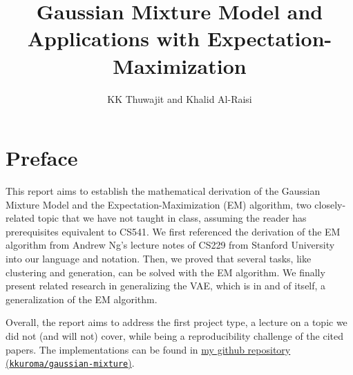 \documentclass{article}
\title{Gaussian Mixture Model and Applications with Expectation-Maximization}
\author{KK Thuwajit and Khalid Al-Raisi}
\begin{document}
\newtheorem{theorem}{Theorem}
\newtheorem{lemma}{Lemma}
\theoremstyle{definition}
\newtheorem{definition}{Definition}
\newtheorem{example}{Example}
\maketitle
\tableofcontents
\newpage
\section*{Preface}
This report aims to establish the mathematical derivation of the Gaussian Mixture Model and the Expectation-Maximization (EM) algorithm, two closely-related topic that we have not taught in class, assuming the reader has prerequisites equivalent to CS541. We first referenced the derivation of the EM algorithm from Andrew Ng's lecture notes of CS229 from Stanford University \cite{em_notes} into our language and notation. Then, we proved that several tasks, like clustering and generation, can be solved with the EM algorithm. We finally present related research in generalizing the VAE, which is in and of itself, a generalization of the EM algorithm.

Overall, the report aims to address the first project type, a lecture on a topic we did not (and will not) cover, while being a reproducibility challenge of the cited papers. The implementations can be found in \href{https://github.com/kkuroma/gaussian-mixture}{my github repository (\texttt{kkuroma/gaussian-mixture})}.
\newpage

\setcounter{section}{-1}









\end{document}
